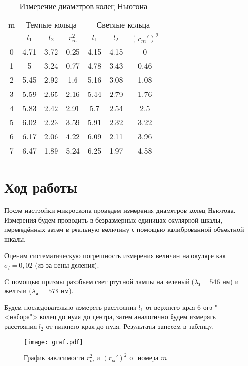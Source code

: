 \documentclass[12pt]{kiarticle} %
\begin{document}
		\begin{table}[h!]
		\caption{Измерение диаметров колец Ньютона}
		\begin{center}
			\begin{tabular}{|c|c|c|c|c|c|c|}
				\hline
				m & \multicolumn{3}{|c|}{Темные кольца} & \multicolumn{3}{|c|}{Светлые кольца} \\
				\cline{2-7}
				& $ l_1 $& $ l_2 $ & $ r_m^2 $ &$ l_1 $& $ l_2 $ & $ (r_m')^2 $ \\
				\hline
				0 & 4.71 & 3.72 & 0.25 & 4.15 & 4.15 & 0 \\
				1 & 5 & 3.24 & 0.77 & 4.78 & 3.43 & 0.46 \\
				2 & 5.45 & 2.92 & 1.6 & 5.16 & 3.08 & 1.08 \\
				3 & 5.59 & 2.65 & 2.16 & 5.44 & 2.79 & 1.76 \\
				4 & 5.83 & 2.42 & 2.91 & 5.7 & 2.54 & 2.5 \\
				5 & 6.02 & 2.23 & 3.59 & 5.91 & 2.32 & 3.22 \\
				6 & 6.17 & 2.06 & 4.22 & 6.09 & 2.11 & 3.96 \\
				7 & 6.47 & 1.89 & 5.24 & 6.25 & 1.97 & 4.58 \\
				\hline
			\end{tabular}
		\end{center}
		\label{table}
	\end{table}
	
	
	\section{Ход работы}
	
	После настройки микроскопа проведем измерения диаметров колец Ньютона. Измерения будем проводить в безразмерных единицах окулярной шкалы, переведённых затем в реальную величину с помощью калиброванной объектной шкалы. 
	
	
	Оценим систематическую погрешность измерения величин на окуляре как $ \sigma_l = 0,02 $ (из-за цены деления).
	
	C помощью призмы разобьем свет ртутной лампы на зеленый ($ \lambda_з = 546 $ нм) и желтый ($ \lambda_ж = 578  $ нм).
	
	Будем последовательно измерять расстояния $ l_1 $ от верхнего края 6-ого "<набора"> колец до нуля до центра, затем аналогично будем измерять расстояния $ l_2 $ от нижнего края до нуля. Результаты занесем в таблицу. 
	
		\begin{figure}[h!]
		\label{graf}
		\texttt{[image: graf.pdf]}
		\caption{График зависимости $ r_m^2$ и $ (r_m')^2 $ от номера $ m $}
	\end{figure}
	
\end{document}

